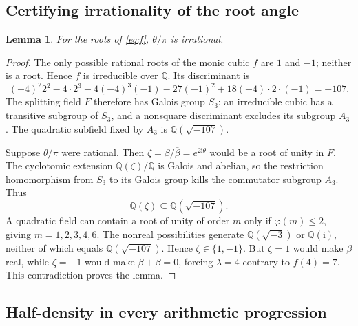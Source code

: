 \documentclass[11pt,letterpaper]{article}
\newtheorem{lemma}[theorem]{Lemma}
\theoremstyle{definition}
\newcommand{\Q}{\mathbb Q}
\newcommand{\ii}{\mathrm i}
\numberwithin{equation}{section}
\begin{document}
\subsection{Certifying irrationality of the root angle}

\begin{lemma}\label{lem:irrational-angle}
For the roots of \eqref{eq:f}, $\theta/\pi$ is irrational.
\end{lemma}
\begin{proof}
The only possible rational roots of the monic cubic $f$ are $1$ and $-1$;
neither is a root. Hence $f$ is irreducible over $\Q$.
Its discriminant is
\[
(-4)^2 2^2-4\cdot2^3-4(-4)^3(-1)-27(-1)^2
+18(-4)\cdot2\cdot(-1)=-107.
\]
The splitting field $F$ therefore has Galois group $S_3$:
an irreducible cubic has a transitive subgroup of $S_3$, and a nonsquare
discriminant excludes its subgroup $A_3$.
The quadratic subfield fixed by $A_3$ is $\Q(\sqrt{-107})$.

Suppose $\theta/\pi$ were rational. Then
$\zeta=\beta/\overline\beta=e^{2\ii\theta}$ would be a root of unity
in $F$. The cyclotomic extension $\Q(\zeta)/\Q$ is Galois and abelian,
so the restriction homomorphism from $S_3$ to its Galois group kills
the commutator subgroup $A_3$. Thus
\[
\Q(\zeta)\subseteq\Q(\sqrt{-107}).
\]
A quadratic field can contain a root of unity of order $m$ only if
$\varphi(m)\le2$, giving $m=1,2,3,4,6$. The nonreal possibilities generate
$\Q(\sqrt{-3})$ or $\Q(\ii)$, neither of which equals
$\Q(\sqrt{-107})$. Hence $\zeta\in\{1,-1\}$.
But $\zeta=1$ would make $\beta$ real, while $\zeta=-1$ would make
$\beta+\overline\beta=0$, forcing $\lambda=4$ contrary to $f(4)=7$.
This contradiction proves the lemma.
\end{proof}

\subsection{Half-density in every arithmetic progression}
\end{document}
